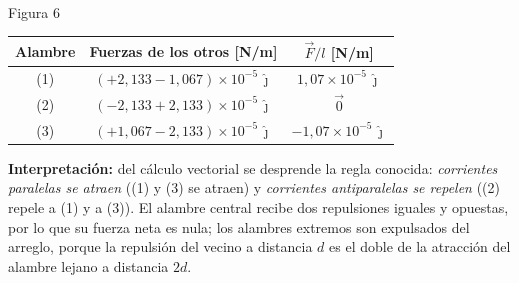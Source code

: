 \documentclass[12pt,letterpaper]{article}
\newcommand{\ejesxyz}[1]{%
  \begin{scope}[shift={(#1)}]
    \draw[->,line width=0.8pt] (0,0)--(0.8,0) node[right,font=\footnotesize]{$x$};
    \draw[->,line width=0.8pt] (0,0)--(0,0.8) node[above,font=\footnotesize]{$y$};
    \draw[line width=0.6pt] (0,0) circle (0.11); \fill (0,0) circle (0.032);
    \node[below left=-1pt,font=\footnotesize] at (0,0){$z$};
  \end{scope}}
\begin{document}
\noindent
\begin{minipage}[c]{0.34\textwidth}
\centering
{}\\[2pt]
{\footnotesize Figura 6}
\end{minipage}%
\hfill
\begin{minipage}[c]{0.60\textwidth}
\centering\small
\renewcommand{\arraystretch}{1.4}
\begin{tabular}{|c|c|c|}
\hline
\textbf{Alambre} & \textbf{Fuerzas de los otros [N/m]} & $\vec{F}/l$ \textbf{[N/m]} \\
\hline
(1) & $(+2{,}133 - 1{,}067)\times10^{-5}\,\hat{\jmath}$
    & $1{,}07\times10^{-5}\,\hat{\jmath}$ \\
(2) & $(-2{,}133 + 2{,}133)\times10^{-5}\,\hat{\jmath}$
    & $\vec{0}$ \\
(3) & $(+1{,}067 - 2{,}133)\times10^{-5}\,\hat{\jmath}$
    & $-1{,}07\times10^{-5}\,\hat{\jmath}$ \\
\hline
\end{tabular}
\end{minipage}

\medskip
\noindent\textbf{Interpretaci\'on:} del c\'alculo vectorial se desprende la regla conocida:
\emph{corrientes paralelas se atraen} ((1) y (3) se atraen) y \emph{corrientes antiparalelas se
repelen} ((2) repele a (1) y a (3)). El alambre central recibe dos repulsiones iguales y opuestas, por
lo que su fuerza neta es nula; los alambres extremos son expulsados del arreglo, porque la repulsi\'on
del vecino a distancia $d$ es el doble de la atracci\'on del alambre lejano a distancia $2d$.
\end{document}
